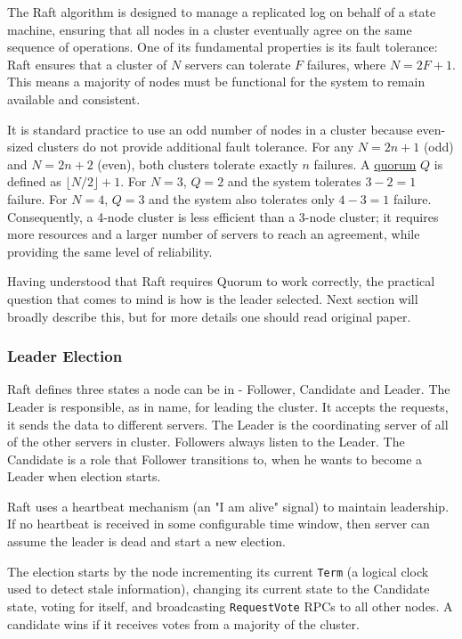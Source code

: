 \documentclass[shortabstract]{iithesis}
\begin{document}
The Raft algorithm is designed to manage a replicated log on behalf of a state machine, ensuring that all nodes in a cluster eventually agree on the same sequence of operations. One of its fundamental properties is its fault tolerance: Raft ensures that a cluster of $N$ servers can tolerate $F$ failures, where $N = 2F + 1$. This means a majority of nodes must be functional for the system to remain available and consistent.

\noindent It is standard practice to use an odd number of nodes in a cluster because even-sized clusters do not provide additional fault tolerance. For any $N = 2n + 1$ (odd) and $N = 2n + 2$ (even), both clusters tolerate exactly $n$ failures. A \hyperref[def:quorum]{quorum} $Q$ is defined as $\lfloor N/2 \rfloor + 1$. For $N = 3$, $Q = 2$ and the system tolerates $3 - 2 = 1$ failure. For $N = 4$, $Q = 3$ and the system also tolerates only $4 - 3 = 1$ failure. Consequently, a 4-node cluster is less efficient than a 3-node cluster; it requires more resources and a larger number of servers to reach an agreement, while providing the same level of reliability. 

Having understood that Raft requires Quorum to work correctly, the practical question that comes to mind is how is the leader selected. Next section will broadly describe this, but for more details one should read original paper.

\subsubsection{Leader Election}
Raft defines three states a node can be in - Follower, Candidate and Leader. The Leader is responsible, as in name, for leading the cluster. It accepts the requests, it sends the data to different servers. The Leader is the coordinating server of all of the other servers in cluster. Followers always listen to the Leader. The Candidate is a role that Follower transitions to, when he wants to become a Leader when election starts. 

Raft uses a heartbeat mechanism (an "I am alive" signal) to maintain leadership. If no heartbeat is received in some configurable time window, then server can assume the leader is dead and start a new election. 

The election starts by the node incrementing its current \texttt{Term} (a logical clock used to detect stale information), changing its current state to the Candidate state, voting for itself, and broadcasting \texttt{RequestVote} RPCs to all other nodes. A candidate wins if it receives votes from a majority of the cluster. 
\end{document}
